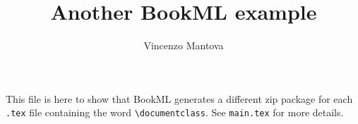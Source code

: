 \documentclass{book}
\title{Another BookML example}
\author{Vincenzo Mantova}
\begin{document}
This file is here to show that BookML generates a different zip package for each \texttt{.tex} file containing the word \texttt{\textbackslash{}documentclass}. See \texttt{main.tex} for more details.
\end{document}
